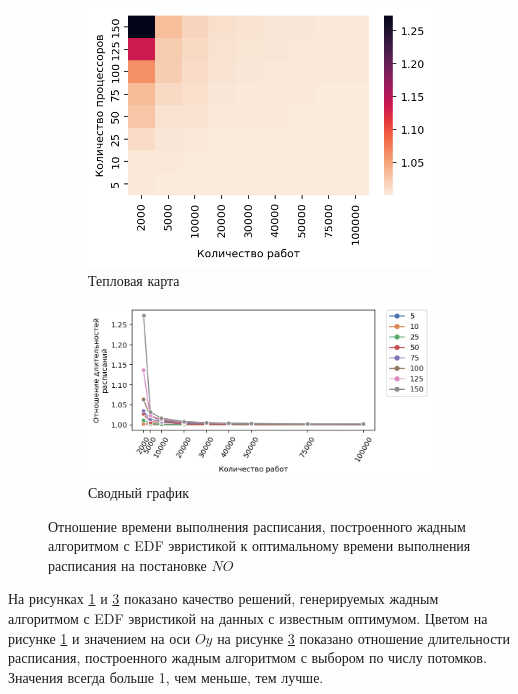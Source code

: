 \begin{figure}[!htbp]
    \centering
    \begin{subfigure}{0.49\textwidth}
        \includegraphics[width=\textwidth]{imgs/ideal_1/NO_EDF/th.png}
        \caption{Тепловая карта}
        \label{fig:NO-EDF-times-heatmap}
    \end{subfigure}
    \hfill
    \begin{subfigure}{0.49\textwidth}
        \includegraphics[width=\textwidth]{imgs/ideal_1/NO_EDF/gr_amalgamated.png}
        \caption{Сводный график} 
        \label{fig:NO-EDF-times-compiled}
    \end{subfigure}
    \caption{Отношение времени выполнения расписания, построенного жадным алгоритмом с EDF эвристикой к оптимальному времени выполнения расписания на постановке $NO$}
\end{figure}

На рисунках \ref{fig:NO-EDF-times-heatmap} и \ref{fig:NO-EDF-times-compiled} показано качество решений, генерируемых жадным алгоритмом с EDF эвристикой на данных с известным оптимумом. Цветом на рисунке \ref{fig:NO-EDF-times-heatmap} и значением на оси $Oy$ на рисунке \ref{fig:NO-EDF-times-compiled} показано отношение длительности расписания, построенного жадным алгоритмом с выбором по числу потомков. Значения всегда больше 1, чем меньше, тем лучше.

